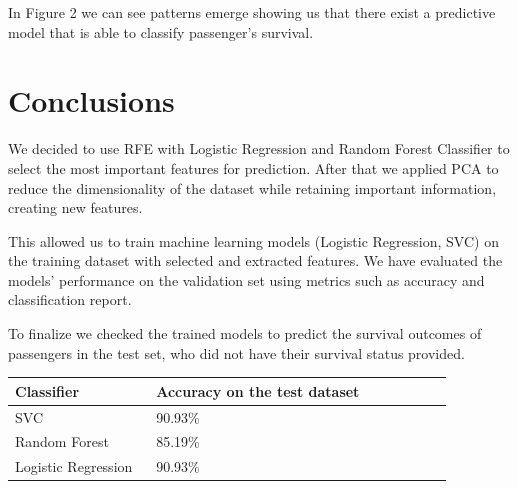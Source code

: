 \documentclass{article}
\begin{document}
In Figure 2 we can see patterns emerge showing us that there exist a predictive model that is able to classify passenger's survival.

\section{Conclusions}

We decided to use RFE with Logistic Regression and Random Forest Classifier to select the most important features for prediction. After that we applied PCA to reduce the dimensionality of the dataset while retaining important information, creating new features.

This allowed us to train machine learning models (Logistic Regression, SVC) on the training dataset with selected and extracted features. We have evaluated the models' performance on the validation set using metrics such as accuracy and classification report.

To finalize we checked the trained models to predict the survival outcomes of passengers in the test set, who did not have their survival status provided.

\begin{table}[H]
\begin{tabular}{p{0.3\linewidth} | p{0.63\linewidth}}
\hline
Classifier  & Accuracy on the test dataset\\
\hline
SVC                  & 90.93\% \\
Random Forest        & 85.19\% \\
Logistic Regression  & 90.93\% \\
\hline
\end{tabular}
\end{table}
\end{document}
